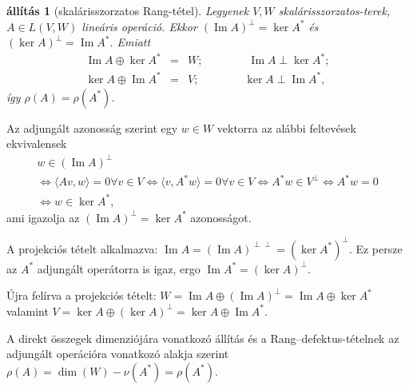 \documentclass[9pt, a4paper, showtrims]{memoir}
\makeatletter
\renewenvironment{proof}[1][\proofname]
    {\par\pushQED{\qed}%
    \normalfont \topsep6\p@\@plus6\p@\relax
    \trivlist
    \item[\hskip\labelsep
        \itshape
    #1\@addpunct{:}]\ignorespaces}
    {\popQED\endtrivlist\@endpefalse}
\theoremstyle{plain}
\newtheorem{proposition}{állítás}[chapter]
\theoremstyle{remark}
\theoremstyle{definition}
\DeclareMathOperator{\im}{Im}
\newcommand{\ip}[2]{\langle#1,#2\rangle}
\makeatother
\begin{document}
\begin{proposition}[skalárisszorzatos Rang-tétel]\label{pr:skrang}
	Legyenek $V,W$ skalárisszorzatos-terek, $A\in L\left( V,W \right)$ lineáris operáció.
	Ekkor
	$(\im A)^\perp=\ker A^\ast$ és
	$(\ker A)^\perp=\im A^\ast.$
	Emiatt
	\begin{eqnarray*}
		\im A\oplus\ker A^\ast&=& W;\qquad\qquad\im A\perp\ker A^\ast;\\
		\ker A\oplus\im A^\ast&=& V;\qquad\qquad\ker A\perp\im A^\ast,
	\end{eqnarray*}
	így $\rho\left( A \right)=\rho\left( A^\ast \right)$.
\end{proposition}
\begin{proof}
	Az adjungált azonosság szerint egy $w\in W$ vektorra az alábbi feltevések ekvivalensek
	\begin{multline*}
		w\in\left( \im A \right)^\perp
		\\
		\iff
		\ip{Av}{w}=0 \forall v\in V
		\iff
		\ip{v}{A^\ast w}=0 \forall v\in V
		\iff
		A^\ast w\in V^\perp
		\iff
		A^\ast w=0
		\\
		\iff
		w\in\ker A^\ast,
	\end{multline*}
	ami igazolja az $\left( \im A \right)^\perp=\ker A^\ast$ azonosságot.

	A projekciós tételt alkalmazva:
	\begin{math}
		\im A=(\im A)^{\perp\perp}=(\ker A^\ast)^\perp
	\end{math}.
	Ez persze az $A^\ast$ adjungált operátorra is igaz,
	ergo
	\begin{math}
		\im A^\ast = \left( \ker A \right)^\perp.
	\end{math}

	Újra felírva a projekciós tételt:
	\begin{math}
		W=\im A\oplus\left( \im A \right)^\perp
		=\im A\oplus\ker A^\ast
	\end{math}
	valamint
	\begin{math}
		V=\ker A\oplus\left( \ker A \right)^\perp
		=
		\ker A\oplus\im A^\ast.
	\end{math}

	A direkt összegek dimenziójára vonatkozó állítás és a Rang--defektus-tételnek az adjungált operációra vonatkozó alakja szerint
	\begin{math}
		\rho\left( A \right)=\dim(W)-\nu\left( A^\ast \right)=\rho\left( A^\ast \right).
	\end{math}
\end{proof}
\end{document}
